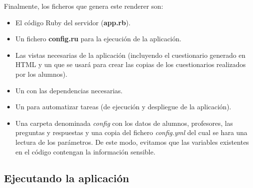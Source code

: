 Finalmente, los ficheros que genera este renderer son:
\begin{itemize}
  \item El c\'odigo Ruby del servidor ({\bfseries app.rb}).
  \item Un fichero {\bfseries config.ru} para la ejecuci\'on de la aplicaci\'on.
  \item Las vistas necesarias de la aplicaci\'on (incluyendo el cuestionario generado en HTML y un   que se usar\'a para crear las copias de los cuestionarios
  realizados por los alumnos).
  \item Un  con las dependencias necesarias.
  \item Un  para automatizar tareas (de ejecuci\'on y despliegue de la aplicaci\'on).
  \item Una carpeta denominada \textit{config} con los datos de alumnos, profesores, las preguntas y respuestas y una copia del fichero \textit{config.yml}
  del cual se hara una lectura de los par\'ametros. De este modo, evitamos que las variables existentes en el c\'odigo contengan la informaci\'on sensible.
\end{itemize}
\newpage

\subsection{Ejecutando la aplicaci\'on}
\label{subsec:Apendice2.16}


